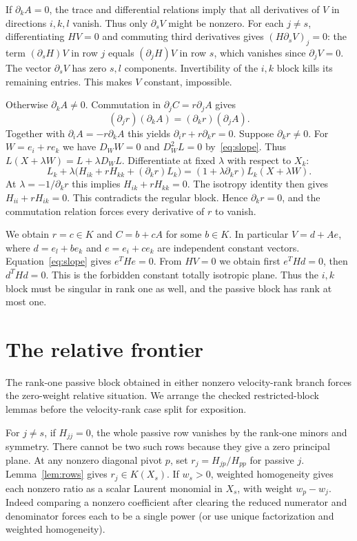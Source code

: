 \documentclass[11pt,a4paper]{article}
\begin{document}
If $\partial_kA=0$, the trace and differential relations imply that all derivatives of $V$ in directions $i,k,l$ vanish. Thus only $\partial_sV$ might be nonzero. For each $j\ne s$, differentiating $HV=0$ and commuting third derivatives gives $(H\partial_sV)_j=0$: the term $(\partial_s H)V$ in row $j$ equals $(\partial_j H)V$ in row $s$, which vanishes since $\partial_jV=0$. The vector $\partial_sV$ has zero $s,l$ components. Invertibility of the $i,k$ block kills its remaining entries. This makes $V$ constant, impossible.

Otherwise $\partial_kA\ne0$. Commutation in $\partial_j C=r\partial_j A$ gives
\[
 (\partial_jr)(\partial_kA)=(\partial_kr)(\partial_jA).
\]
Together with $\partial_i A=-r\partial_k A$ this yields $\partial_i r+r\partial_kr=0$. Suppose $\partial_kr\ne0$. For $W=e_i+r e_k$ we have $D_WW=0$ and $D_W^2L=0$ by~\eqref{eq:slope}. Thus $L(X+\lambda W)=L+\lambda D_WL$. Differentiate at fixed $\lambda$ with respect to $X_k$:
\[
 L_k+\lambda\bigl(H_{ik}+rH_{kk}+(\partial_kr)L_k\bigr)
 =(1+\lambda\partial_kr)L_k(X+\lambda W).
\]
At $\lambda=-1/\partial_kr$ this implies $H_{ik}+rH_{kk}=0$. The isotropy identity then gives $H_{ii}+rH_{ik}=0$. This contradicts the regular block. Hence $\partial_kr=0$, and the commutation relation forces every derivative of $r$ to vanish.

We obtain $r=c\in K$ and $C=b+cA$ for some $b\in K$. In particular $V=d+Ae$, where $d=e_l+b e_k$ and $e=e_i+c e_k$ are independent constant vectors. Equation~\eqref{eq:slope} gives $e^THe=0$. From $HV=0$ we obtain first $e^THd=0$, then $d^THd=0$. This is the forbidden constant totally isotropic plane. Thus the $i,k$ block must be singular in rank one as well, and the passive block has rank at most one.


\section{The relative frontier}\label{sec:relative}
The rank-one passive block obtained in either nonzero velocity-rank branch forces the zero-weight relative situation. We arrange the checked restricted-block lemmas before the velocity-rank case split for exposition.

For $j\ne s$, if $H_{jj}=0$, the whole passive row vanishes by the rank-one minors and symmetry. There cannot be two such rows because they give a zero principal plane. At any nonzero diagonal pivot $p$, set $r_j=H_{jp}/H_{pp}$ for passive $j$. Lemma~\ref{lem:rows} gives $r_j\in K(X_s)$. If $w_s>0$, weighted homogeneity gives each nonzero ratio as a scalar Laurent monomial in $X_s$, with weight $w_p-w_j$. Indeed comparing a nonzero coefficient after clearing the reduced numerator and denominator forces each to be a single power (or use unique factorization and weighted homogeneity).
\end{document}
